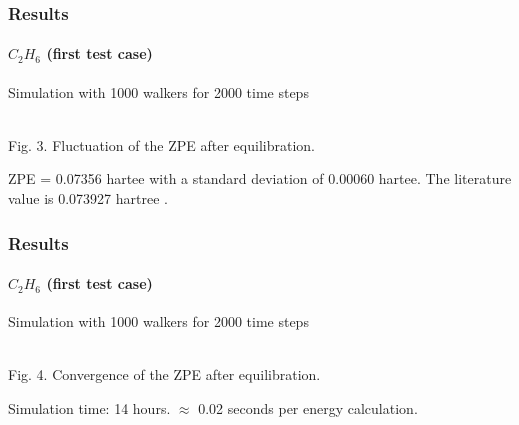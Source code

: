 \documentclass{beamer}
\begin{document}
\begin{frame}
\frametitle{Results}
\framesubtitle{$C_2 H_6$ (first test case)}
Simulation with 1000 walkers for 2000 time steps
\begin{center}
\\
Fig. 3. Fluctuation of the ZPE after equilibration.
\end{center}
ZPE = 0.07356 hartee with a standard deviation of 0.00060 hartee. The literature value is 0.073927 hartree \cite{c2h6}.\\

\end{frame}

\begin{frame}
\frametitle{Results}
\framesubtitle{$C_2 H_6$ (first test case)}
Simulation with 1000 walkers for 2000 time steps
\begin{center}
\\
Fig. 4. Convergence of the ZPE after equilibration.
\end{center}
Simulation time: 14 hours. $\approx$ 0.02 seconds per energy calculation.

\end{frame}
\end{document}
